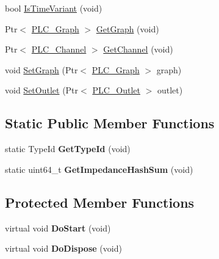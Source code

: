 \begin{DoxyCompactItemize}
\item 
bool \hyperlink{classns3_1_1PLC__Node_a07aa4b7127953ab3285c50d00ebd550d}{\-Is\-Time\-Variant} (void)
\item 
\-Ptr$<$ \hyperlink{classns3_1_1PLC__Graph}{\-P\-L\-C\-\_\-\-Graph} $>$ \hyperlink{classns3_1_1PLC__Node_aa4f801cb511cb5d99b5918ae47d74b18}{\-Get\-Graph} (void)
\item 
\-Ptr$<$ \hyperlink{classns3_1_1PLC__Channel}{\-P\-L\-C\-\_\-\-Channel} $>$ \hyperlink{classns3_1_1PLC__Node_a1af9782b5b1703cb60b149fde6ea5c53}{\-Get\-Channel} (void)
\item 
void \hyperlink{classns3_1_1PLC__Node_afd7f60aa8c6cb699b303fe3bba4035d2}{\-Set\-Graph} (\-Ptr$<$ \hyperlink{classns3_1_1PLC__Graph}{\-P\-L\-C\-\_\-\-Graph} $>$ graph)
\item 
void \hyperlink{classns3_1_1PLC__Node_abbd0e0d52256ff736e33a22c708f1111}{\-Set\-Outlet} (\-Ptr$<$ \hyperlink{classns3_1_1PLC__Outlet}{\-P\-L\-C\-\_\-\-Outlet} $>$ outlet)
\end{DoxyCompactItemize}
\subsection*{\-Static \-Public \-Member \-Functions}
\begin{DoxyCompactItemize}
\item 
\hypertarget{classns3_1_1PLC__Node_a5a51763811f8468bffb7d0f34e8eedd5}{static \-Type\-Id {\bfseries \-Get\-Type\-Id} (void)}\label{classns3_1_1PLC__Node_a5a51763811f8468bffb7d0f34e8eedd5}

\item 
\hypertarget{classns3_1_1PLC__Node_abea56a73f524e9817bc1847b5d9ba82d}{static uint64\-\_\-t {\bfseries \-Get\-Impedance\-Hash\-Sum} (void)}\label{classns3_1_1PLC__Node_abea56a73f524e9817bc1847b5d9ba82d}

\end{DoxyCompactItemize}
\subsection*{\-Protected \-Member \-Functions}
\begin{DoxyCompactItemize}
\item 
\hypertarget{classns3_1_1PLC__Node_a4a29e9bd60301a431ab162f2eb159961}{virtual void {\bfseries \-Do\-Start} (void)}\label{classns3_1_1PLC__Node_a4a29e9bd60301a431ab162f2eb159961}

\item 
\hypertarget{classns3_1_1PLC__Node_aba36f5bab59110d3f39c8fb34e956f23}{virtual void {\bfseries \-Do\-Dispose} (void)}\label{classns3_1_1PLC__Node_aba36f5bab59110d3f39c8fb34e956f23}

\end{DoxyCompactItemize}
